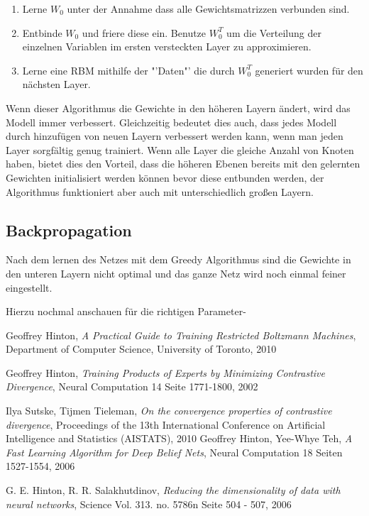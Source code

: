 \documentclass[12pt]{article}
\begin{document}
\begin{enumerate}
\item Lerne $W_0$ unter der Annahme dass alle Gewichtsmatrizzen verbunden sind.
\item Entbinde $W_0$ und friere diese ein. Benutze $W_0^T$ um die Verteilung der einzelnen Variablen im ersten versteckten Layer zu approximieren.
\item Lerne eine RBM mithilfe der "'Daten"' die durch $W_0^T$ generiert wurden für den nächsten Layer.
\end{enumerate}

Wenn dieser Algorithmus die Gewichte in den höheren Layern ändert, wird das Modell immer verbessert. Gleichzeitig bedeutet dies auch, dass jedes Modell durch hinzufügen von neuen Layern verbessert werden kann, wenn man jeden Layer sorgfältig genug trainiert. Wenn alle Layer die gleiche Anzahl von Knoten haben, bietet dies den Vorteil, dass die höheren Ebenen bereits mit den gelernten Gewichten initialisiert werden können bevor diese entbunden werden, der Algorithmus funktioniert aber auch mit unterschiedlich großen Layern. \cite{learning}

\subsection{Backpropagation}
Nach dem lernen des Netzes mit dem Greedy Algorithmus sind die Gewichte in den unteren Layern nicht optimal und das ganze Netz wird noch einmal feiner eingestellt. 

Hierzu nochmal \cite{backprop} anschauen für die richtigen Parameter-

\begin{thebibliography}{9}

Geoffrey Hinton,
\emph{A Practical Guide to Training Restricted Boltzmann Machines},
Department of Computer Science, 
University of Toronto,
2010

Geoffrey Hinton,
\emph{Training Products of Experts by Minimizing Contrastive Divergence},
Neural Computation 14 Seite 1771-1800,
2002

Ilya Sutske, Tijmen Tieleman,
\emph{On the convergence properties of contrastive divergence},
Proceedings of the 13th International Conference on Artificial Intelligence and Statistics (AISTATS),
2010 
Geoffrey Hinton, Yee-Whye Teh,
\emph{A Fast Learning Algorithm for Deep Belief Nets},
Neural Computation 18 Seiten 1527-1554,
2006

G. E. Hinton, R. R. Salakhutdinov,
\emph{Reducing the dimensionality of data with neural networks},
Science Vol. 313. no. 5786n Seite 504 - 507,
2006

\end{thebibliography}
\end{document}
